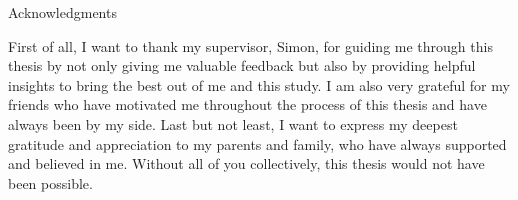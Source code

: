 \thispagestyle{empty}

\vspace*{20mm}

\begin{center}
    { Acknowledgments}
\end{center}

\vspace{10mm}

First of all, I want to thank my supervisor, Simon, for guiding me through this thesis by not only giving me valuable feedback but also by providing helpful insights to bring the best out of me and this study. I am also very grateful for my friends who have motivated me throughout the process of this thesis and have always been by my side. Last but not least, I want to express my deepest gratitude and appreciation to my parents and family, who have always supported and believed in me. Without all of you collectively, this thesis would not have been possible.

\cleardoublepage{}
